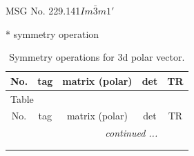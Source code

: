 \documentclass[fleqn,8pt]{jsarticle}
\begin{document}
\setcounter{MaxMatrixCols}{32}

\renewcommand{\tablename}{Table~}
\renewcommand{\figurename}{Figure~}
\begin{center}
\LARGE
MSG No. 229.141\quad$Im\bar{3}m1'$
\end{center}
* symmetry operation
\renewcommand{\arraystretch}{1.3}
\begin{longtable}{ccccc}
\caption{Symmetry operations for 3d polar vector.}
 \\
 \hline \hline
No. & tag & matrix (polar) & det & TR \\ \hline \endfirsthead

\multicolumn{4}{l}{\tablename\ \thetable{}} \\
 \hline \hline
No. & tag & matrix (polar) & det & TR \\ \hline \endhead

 \hline \hline
\multicolumn{4}{r}{\footnotesize\it continued ...} \\ \endfoot

 \hline \hline
\multicolumn{4}{r}{} \\ \endlastfoot


\end{longtable}
\end{document}
